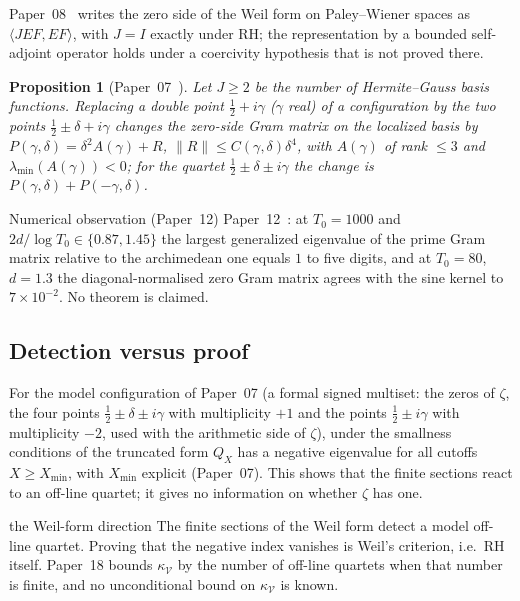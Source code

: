 \documentclass[11pt]{amsart}
\newtheorem{proposition}[theorem]{Proposition}
\theoremstyle{definition}
\theoremstyle{remark}
\newcommand{\half}{\tfrac{1}{2}}
\newcommand{\gam}{\gamma}
\newcommand{\kV}{\kappa_{\mathcal V}}
\begin{document}
Paper~08~\cite{P08} writes the zero side of the Weil form on Paley--Wiener spaces as
$\langle JEF,EF\rangle$, with $J=I$ exactly under RH; the representation by a bounded
self-adjoint operator holds under a coercivity hypothesis that is not proved there.

\begin{proposition}[{Paper~07~\cite[Lemma~3.1 and Thm.~3.2]{P07}}]
\label{thm:localization}
Let $J\ge2$ be the number of Hermite--Gauss basis functions. Replacing a double point
$\half+i\gam$ \textup{(}$\gam$ real\textup{)} of a configuration by the two points
$\half\pm\delta+i\gam$ changes the zero-side Gram matrix on the localized basis by
$P(\gam,\delta)=\delta^2A(\gam)+R$, $\|R\|\le C(\gam,\delta)\delta^4$, with $A(\gam)$ of
rank $\le3$ and $\lambda_{\min}(A(\gam))<0$; for the quartet $\half\pm\delta\pm i\gam$ the
change is $P(\gam,\delta)+P(-\gam,\delta)$.
\end{proposition}

\begin{nogobox}{Numerical observation (Paper~12)}
Paper~12~\cite[Obs.~3.1 and 4.1]{P12}: at $T_0=1000$ and $2d/\log T_0\in\{0.87,1.45\}$
the largest generalized eigenvalue of the prime Gram matrix relative to the archimedean
one equals $1$ to five digits, and at $T_0=80$, $d=1.3$ the diagonal-normalised zero Gram
matrix agrees with the sine kernel to $7\times10^{-2}$. No theorem is claimed.
\end{nogobox}

\subsection{Detection versus proof}

For the model configuration of Paper~07 (a formal signed multiset: the zeros of
$\zeta$, the four points $\half\pm\delta\pm i\gam$ with multiplicity $+1$ and the points
$\half\pm i\gam$ with multiplicity $-2$, used with the arithmetic side of $\zeta$), under
the smallness conditions of \cite[Thm.~5.1]{P07} the truncated form $Q_X$ has a negative
eigenvalue for all cutoffs $X\ge X_{\min}$, with $X_{\min}$ explicit
(Paper~07). This shows that the finite sections react to an
off-line quartet; it gives no information on whether $\zeta$ has one.

\begin{wallbox}{the Weil-form direction}
The finite sections of the Weil form detect a model off-line quartet. Proving that the
negative index vanishes is Weil's criterion, i.e.\ RH itself. Paper~18 bounds $\kV$ by
the number of off-line quartets when that number is finite, and no unconditional bound on
$\kV$ is known.
\end{wallbox}
\end{document}
